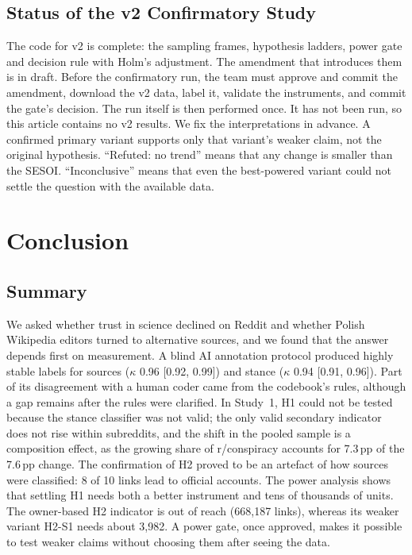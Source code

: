 \documentclass[10pt,a4paper]{article}
\begin{document}
\subsection{Status of the v2 Confirmatory Study}
The code for v2 is complete: the sampling frames, hypothesis ladders, power gate and decision rule with
Holm's adjustment. The amendment that introduces them is in draft. Before the confirmatory run, the team
must approve and commit the amendment, download the v2 data, label it, validate the instruments, and
commit the gate's decision. The run itself is then performed once. It has not been run, so this
article contains no v2 results. We fix the interpretations in advance. A confirmed primary variant supports
only that variant's weaker claim, not the original hypothesis. ``Refuted: no trend'' means that any change
is smaller than the SESOI. ``Inconclusive'' means that even the best-powered variant could not settle the
question with the available data.

\section{Conclusion}
\label{sec:conclusion}

\subsection{Summary}
We asked whether trust in science declined on Reddit and whether Polish Wikipedia editors turned to
alternative sources, and we found that the answer depends first on measurement. A blind AI annotation
protocol produced highly stable labels for sources ($\kappa$ 0.96 [0.92, 0.99]) and stance
($\kappa$ 0.94 [0.91, 0.96]). Part of its disagreement with a human coder came from the codebook's rules, although a gap remains after
the rules were clarified. In Study~1, H1 could not be tested because the stance classifier was not valid; the
only valid secondary indicator does not rise within subreddits, and the shift in the pooled sample is a
composition effect, as the growing share of r/conspiracy accounts for
7.3\,pp of the 7.6\,pp change. The confirmation of H2
proved to be an artefact of how sources were classified: 8 of
10 links lead to official accounts. The power analysis shows that settling H1 needs both
a better instrument and tens of thousands of units. The owner-based H2 indicator is out of reach
(668,187 links), whereas its weaker variant H2-S1 needs about 3,982. A power
gate, once approved, makes it possible to test weaker claims without choosing them after seeing the data.
\end{document}
